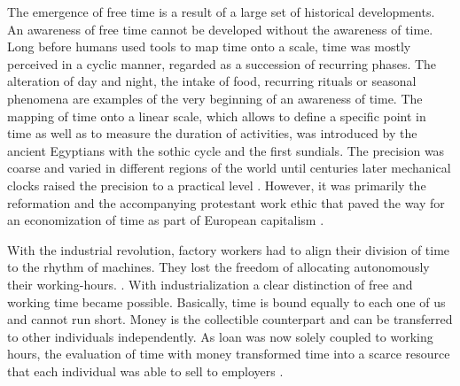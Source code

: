 \documentclass[12pt,numbers=noenddot,parskip,bibliography=totocnumbered,listof=totocnumbered,draft]{scrreprt}
\begin{document}
The emergence of free time is a result of a large set of historical developments. An awareness of free time cannot be developed without the awareness of time. Long before humans used tools to map time onto a scale, time was mostly perceived in a cyclic manner, regarded as a succession of recurring phases. The alteration of day and night, the intake of food, recurring rituals or seasonal phenomena are examples of the very beginning of an awareness of time. The mapping of time onto a linear scale, which allows to define a specific point in time as well as to measure the duration of activities, was introduced by the ancient Egyptians with the sothic cycle and the first sundials. \citep[p.25-27]{whitrow1989} The precision was coarse and varied in different regions of the world until centuries later mechanical clocks raised the precision to a practical level \citep[p.103]{whitrow1989}. However, it was primarily the reformation and the accompanying protestant work ethic that paved the way for an economization of time as part of European capitalism \citep[p.22]{weber2006}.

With the industrial revolution, factory workers had to align their division of time to the rhythm of machines. They lost the freedom of allocating autonomously their working-hours. \citep[p.160]{whitrow1989}. With industrialization a clear distinction of free and working time became possible. Basically, time is bound equally to each one of us and cannot run short. Money is the collectible counterpart and can be transferred to other individuals independently. As loan was now solely coupled to working hours, the evaluation of time with money transformed time into a scarce resource that each individual was able to sell to employers \citep[p.54]{marx1867}. 
\end{document}
